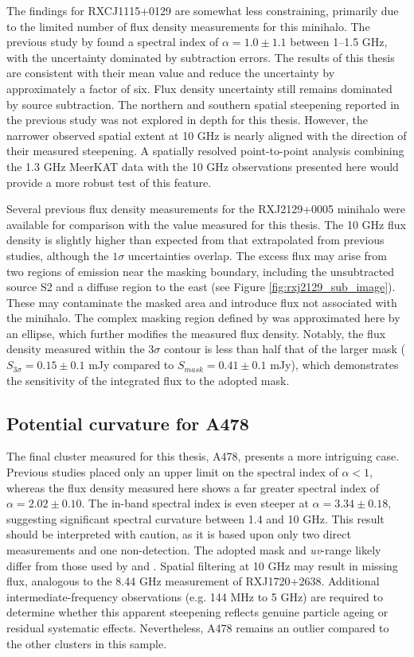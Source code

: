 The findings for RXCJ1115+0129 are somewhat less constraining, primarily due to the limited number of flux density measurements for this minihalo. The previous study by \citet{Trehaeven2023} found a spectral index of $\alpha=1.0\pm1.1$ between 1--1.5 GHz, with the uncertainty dominated by subtraction errors. The results of this thesis are consistent with their mean value and reduce the uncertainty by approximately a factor of six. Flux density uncertainty still remains dominated by source subtraction. The northern and southern spatial steepening reported in the previous study was not explored in depth for this thesis. However, the narrower observed spatial extent at 10 GHz is nearly aligned with the direction of their measured steepening. A spatially resolved point-to-point analysis combining the 1.3 GHz MeerKAT data with the 10 GHz observations presented here would provide a more robust test of this feature.

Several previous flux density measurements for the RXJ2129+0005 minihalo were available for comparison with the value measured for this thesis. The 10 GHz flux density is slightly higher than expected from that extrapolated from previous studies, although the $1\sigma$ uncertainties overlap. The excess flux may arise from two regions of emission near the masking boundary, including the unsubtracted source S2 and a diffuse region to the east (see Figure \ref{fig:rxj2129_sub_image}). These may contaminate the masked area and introduce flux not associated with the minihalo. The complex masking region defined by \citet{Giacintucci2014} was approximated here by an ellipse, which further modifies the measured flux density. Notably, the flux density measured within the $3\sigma$ contour is less than half that of the larger mask ($S_{3\sigma} = 0.15\pm0.1$ mJy compared to $S_{mask} = 0.41\pm0.1$ mJy), which demonstrates the sensitivity of the integrated flux to the adopted mask.

\subsection{Potential curvature for A478}

The final cluster measured for this thesis, A478, presents a more intriguing case. Previous studies placed only an upper limit on the spectral index of $\alpha<1$, whereas the flux density measured here shows a far greater spectral index of $\alpha = 2.02\pm0.10$. The in-band spectral index is even steeper at $\alpha = 3.34\pm0.18$, suggesting significant spectral curvature between 1.4 and 10 GHz. This result should be interpreted with caution, as it is based upon only two direct measurements and one non-detection. The adopted mask and \textit{uv}-range likely differ from those used by \citet{Giacintucci2014} and \citet{Savini2019}. Spatial filtering at 10 GHz may result in missing flux, analogous to the 8.44 GHz measurement of RXJ1720+2638. Additional intermediate-frequency observations (e.g. 144 MHz to 5 GHz) are required to determine whether this apparent steepening reflects genuine particle ageing or residual systematic effects. Nevertheless, A478 remains an outlier compared to the other clusters in this sample.


